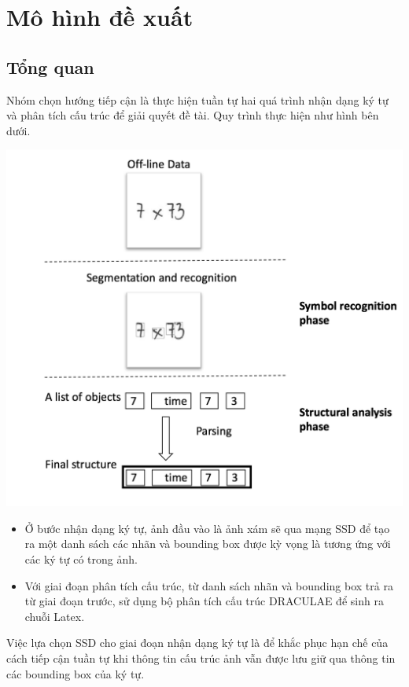 \documentclass[a4paper,12pt]{article}
\begin{document}
	
	\newpage
	\section{Mô hình đề xuất}
	\label{sec: mohinhdexuat}
	\subsection{Tổng quan}
	Nhóm chọn hướng tiếp cận là thực hiện tuần tự hai quá trình nhận dạng ký tự và phân tích cấu trúc để giải quyết đề tài. Quy trình thực hiện như hình bên dưới.
	\begin{center}
		
		\centering
		\includegraphics[width=0.8\linewidth]{overview}
		\vspace{0.5cm}
	\end{center}
	\begin{itemize}
		\item Ở bước nhận dạng ký tự, ảnh đầu vào là ảnh xám sẽ qua mạng SSD\cite{liu2016ssd} để tạo ra một danh sách các nhãn và bounding box được kỳ vọng là tương ứng với các ký tự có trong ảnh.
		\item Với giai đoạn phân tích cấu trúc, từ danh sách nhãn và bounding box trả ra từ giai đoạn trước, sử dụng bộ phân tích cấu trúc DRACULAE \cite{zanibbi} để sinh ra chuỗi Latex.
	\end{itemize}
	Việc lựa chọn SSD cho giai đoạn nhận dạng ký tự là để khắc phục hạn chế của cách tiếp cận tuần tự khi thông tin cấu trúc ảnh vẫn được lưu giữ qua thông tin các bounding box của ký tự. 
\end{document}
